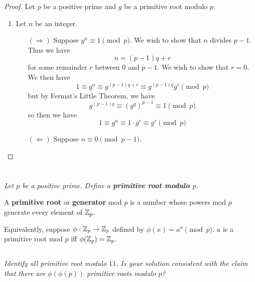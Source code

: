 \documentclass[12pt]{article}
\begin{document}
    \begin{proof} Let $p$ be a positive prime and $g$ be a primitive root modulo $p$.
        \begin{enumerate}
            \item Let $n$ be an integer.
            \begin{itemize}
                \item[$(\Longrightarrow)$] Suppose $g^n \equiv 1 \pmod{p}$. We wish to show that $n$ divides $p - 1$. Thus we have
                $$n = (p - 1)q + r$$
                for some remainder $r$ between $0$ and $p - 1$. We wish to show that $r = 0$. We then have
                $$1 \equiv g^n \equiv g^{(p - 1)q + r} \equiv g^{(p - 1)q}g^r \pmod{p}$$
                but by Fermat's Little Theorem, we have
                $$g^{(p - 1)q} \equiv (g^q)^{p - 1} \equiv 1 \pmod{p}$$
                so then we have
                $$1 \equiv g^n \equiv 1 \cdot g^r \equiv g^r \pmod{p}$$

                \item[$(\Longleftarrow)$] Suppose $n \equiv 0 \pmod{p - 1}$.
            \end{itemize}
        \end{enumerate}
    \end{proof}

\section{}
    \subsection{} \textit{Let $p$ be a positive prime. Define a \textbf{primitive root modulo $p$}.}

        \begin{defn}
            A \textbf{primitive root} or \textbf{generator} mod $p$ is a number whose powers mod $p$ generate every element of $\mathbb{Z}_p$.

            Equivalently, suppose $\phi : \mathbb{Z}_p \to \mathbb{Z}_p$ defined by $\phi(x) = a^x \pmod{p}$. $a$ is a primitive root mod $p$ iff $\phi(\mathbb{Z}_p) = \mathbb{Z}_p$.
        \end{defn}

    \subsection{} \textit{Identify all primitive root modulo $11$. Is your solution consistent with the claim that there are $\phi(\phi(p))$ primitive roots modulo $p$?}
\end{document}

